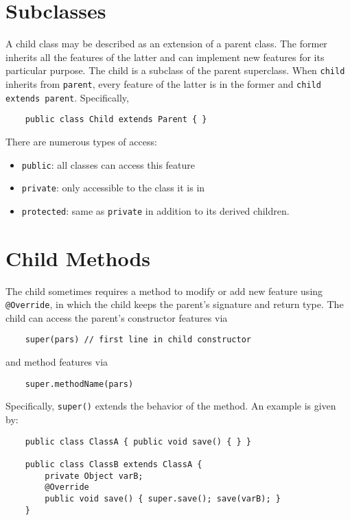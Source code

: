 \documentclass[letterpaper, openany, justified]{tufte-book}
\newcommand{\cd}[1]{\lstinline{#1}}
\begin{document}
\begin{fullwidth}
\section{Subclasses}
A child class may be described as an extension of a parent class. The former inherits all the features of the latter and can implement new features for its particular purpose. The child is a subclass of the parent superclass. When \cd{child} inherits from \cd{parent}, every feature of the latter is in the former and \cd{child extends parent}. Specifically,
\begin{lstlisting}
    public class Child extends Parent { }
\end{lstlisting}
There are numerous types of access:
\begin{itemize}
    \item \cd{public}: all classes can access this feature
    \item \cd{private}: only accessible to the class it is in
    \item \cd{protected}: same as \cd{private} in addition to its derived children.
\end{itemize}

\section{Child Methods}
The child sometimes requires a method to modify or add new feature using \cd{@Override}, in which the child keeps the parent's signature and return type. The child can access the parent's constructor features via
\begin{lstlisting}
    super(pars) // first line in child constructor
\end{lstlisting}
and method features via
\begin{lstlisting}
    super.methodName(pars)
\end{lstlisting}
Specifically, \cd{super()} extends the behavior of the method. An example is given by:
\begin{lstlisting}
    public class ClassA { public void save() { } }

    public class ClassB extends ClassA {
        private Object varB;
        @Override
        public void save() { super.save(); save(varB); }
    }
\end{lstlisting}


\end{fullwidth}
\end{document}
